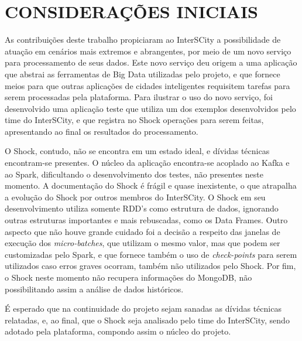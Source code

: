\chapter{CONSIDERAÇÕES INICIAIS}
\label{chapter:final}

As contribuições deste trabalho propiciaram ao InterSCity a possibilidade de
atuação em cenários mais extremos e abrangentes, por meio de um novo serviço
para processamento de seus dados. Este novo serviço deu origem a uma aplicação
que abstrai as ferramentas de Big Data utilizadas pelo projeto, e que fornece
meios para que outras aplicações de cidades inteligentes requisitem tarefas para
serem processadas pela plataforma. Para ilustrar o uso do novo serviço, foi
desenvolvido uma aplicação teste que utiliza um dos exemplos desenvolvidos
pelo time do InterSCity, e que registra no Shock operações para serem feitas,
apresentando ao final os resultados do processamento.

O Shock, contudo, não se encontra em um estado ideal, e dívidas técnicas
encontram-se presentes. O núcleo da aplicação encontra-se acoplado ao Kafka e
ao Spark, dificultando o desenvolvimento dos testes, não presentes neste
momento. A documentação do Shock é frágil e quase inexistente, o que atrapalha
a evolução do Shock por outros membros do InterSCity. O Shock em seu
desenvolvimento utiliza somente RDD's como estrutura de dados, ignorando outras
estruturas importantes e mais rebuscadas, como os Data Frames. Outro aspecto
que não houve grande cuidado foi a decisão a respeito das janelas de execução
dos \textit{micro-batches}, que utilizam o mesmo valor, mas que podem ser
customizadas pelo Spark, e que fornece também o uso de \textit{check-points}
para serem utilizados caso erros graves ocorram, também não utilizados  pelo
Shock. Por fim, o Shock neste momento não recupera informações do MongoDB,
não possibilitando assim a análise de dados históricos.

É esperado que na continuidade do projeto sejam sanadas as dívidas técnicas
relatadas, e, ao final, que o Shock seja analisado pelo time do InterSCity,
sendo adotado pela plataforma, compondo assim o núcleo do projeto.
